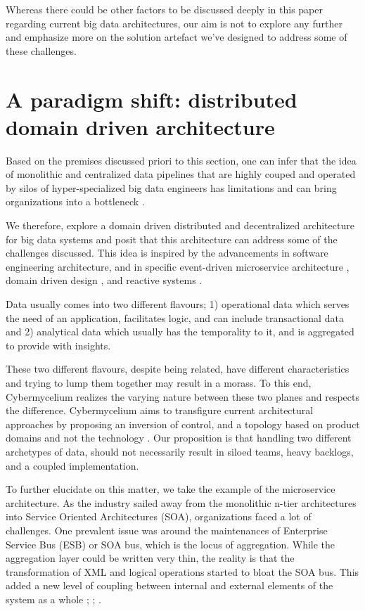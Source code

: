 \documentclass[review]{elsarticle}
\begin{document}
Whereas there could be other factors to be discussed deeply in this paper regarding current big data architectures, our aim is not to explore any further and emphasize more on the solution artefact we've designed to address some of these challenges. 

\section{A paradigm shift: distributed domain driven architecture}

Based on the premises discussed priori to this section, one can infer that the idea of monolithic and centralized data pipelines that are highly couped and operated by silos of hyper-specialized big data engineers has limitations and can bring organizations into a bottleneck . 

We therefore, explore a domain driven distributed and decentralized architecture for big data systems and posit that this architecture can address some of the challenges discussed. This idea is inspired by the advancements in software engineering architecture, and in specific event-driven microservice architecture \cite{EventDrivenMicroServices}, domain driven design \cite{evans2004domain}, and reactive systems \cite{aceto2007reactive}.

Data usually comes into two different flavours; 1) operational data which serves the need of an application, facilitates logic, and can include transactional data and 2) analytical data which usually has the temporality to it, and is aggregated to provide with insights. 

These two different flavours, despite being related, have different characteristics and trying to lump them together may result in a morass. To this end, Cybermycelium realizes the varying nature between these two planes and respects the difference. Cybermycelium aims to transfigure current architectural approaches by proposing an inversion of control, and a topology based on product domains and not the technology \cite{dataMeshArticle}. Our proposition is that handling two different archetypes of data, should not necessarily result in siloed teams, heavy backlogs, and a coupled implementation. 

To further elucidate on this matter, we take the example of the microservice architecture. As the industry sailed away from the monolithic n-tier architectures into Service Oriented Architectures (SOA), organizations faced a lot of challenges. One prevalent issue was around the maintenances of Enterprise Service Bus (ESB) or SOA bus, which is the locus of aggregation. While the aggregation layer could be written very thin, the reality is that the transformation of XML and logical operations started to bloat the SOA bus. This added a new level of coupling between internal and external elements of the system as a whole \cite{di2017architecting}; \cite{zimmermann2017microservices}; \cite{waseem2020systematic}. 
\end{document}
